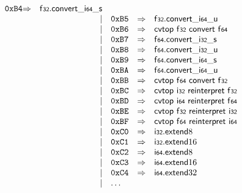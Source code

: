$$\begin{array}{@{}l@{}rrlll@{}l@{}}
\mathtt{0xB4} &\Rightarrow& \mathsf{f{\scriptstyle32}} . {{{{\mathsf{convert}}{\mathsf{\_}}}{\mathsf{i{\scriptstyle64}}}}{\mathsf{\_}}}{\mathsf{s}} \\ &&|&
\mathtt{0xB5} &\Rightarrow& \mathsf{f{\scriptstyle32}} . {{{{\mathsf{convert}}{\mathsf{\_}}}{\mathsf{i{\scriptstyle64}}}}{\mathsf{\_}}}{\mathsf{u}} \\ &&|&
\mathtt{0xB6} &\Rightarrow& \mathsf{cvtop}~\mathsf{f{\scriptstyle32}}~\mathsf{convert}~\mathsf{f{\scriptstyle64}} \\ &&|&
\mathtt{0xB7} &\Rightarrow& \mathsf{f{\scriptstyle64}} . {{{{\mathsf{convert}}{\mathsf{\_}}}{\mathsf{i{\scriptstyle32}}}}{\mathsf{\_}}}{\mathsf{s}} \\ &&|&
\mathtt{0xB8} &\Rightarrow& \mathsf{f{\scriptstyle64}} . {{{{\mathsf{convert}}{\mathsf{\_}}}{\mathsf{i{\scriptstyle32}}}}{\mathsf{\_}}}{\mathsf{u}} \\ &&|&
\mathtt{0xB9} &\Rightarrow& \mathsf{f{\scriptstyle64}} . {{{{\mathsf{convert}}{\mathsf{\_}}}{\mathsf{i{\scriptstyle64}}}}{\mathsf{\_}}}{\mathsf{s}} \\ &&|&
\mathtt{0xBA} &\Rightarrow& \mathsf{f{\scriptstyle64}} . {{{{\mathsf{convert}}{\mathsf{\_}}}{\mathsf{i{\scriptstyle64}}}}{\mathsf{\_}}}{\mathsf{u}} \\ &&|&
\mathtt{0xBB} &\Rightarrow& \mathsf{cvtop}~\mathsf{f{\scriptstyle64}}~\mathsf{convert}~\mathsf{f{\scriptstyle32}} \\ &&|&
\mathtt{0xBC} &\Rightarrow& \mathsf{cvtop}~\mathsf{i{\scriptstyle32}}~\mathsf{reinterpret}~\mathsf{f{\scriptstyle32}} \\ &&|&
\mathtt{0xBD} &\Rightarrow& \mathsf{cvtop}~\mathsf{i{\scriptstyle64}}~\mathsf{reinterpret}~\mathsf{f{\scriptstyle64}} \\ &&|&
\mathtt{0xBE} &\Rightarrow& \mathsf{cvtop}~\mathsf{f{\scriptstyle32}}~\mathsf{reinterpret}~\mathsf{i{\scriptstyle32}} \\ &&|&
\mathtt{0xBF} &\Rightarrow& \mathsf{cvtop}~\mathsf{f{\scriptstyle64}}~\mathsf{reinterpret}~\mathsf{i{\scriptstyle64}} \\ &&|&
\mathtt{0xC0} &\Rightarrow& {\mathsf{i{\scriptstyle32}}.\mathsf{extend}}{8} \\ &&|&
\mathtt{0xC1} &\Rightarrow& {\mathsf{i{\scriptstyle32}}.\mathsf{extend}}{16} \\ &&|&
\mathtt{0xC2} &\Rightarrow& {\mathsf{i{\scriptstyle64}}.\mathsf{extend}}{8} \\ &&|&
\mathtt{0xC3} &\Rightarrow& {\mathsf{i{\scriptstyle64}}.\mathsf{extend}}{16} \\ &&|&
\mathtt{0xC4} &\Rightarrow& {\mathsf{i{\scriptstyle64}}.\mathsf{extend}}{32} \\ &&|&
\dots \\
\end{array}
$$

